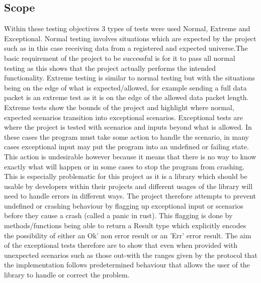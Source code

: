 \documentclass[11pt,a4paper]{report}
\begin{document}
\subsection{Scope}
Within these testing objectives 3 types of tests were used Normal, Extreme and Exceptional. Normal testing involves situations which are expected by the project such as in this case receiving data from a registered and expected universe.The basic requirement of the project to be successful is for it to pass all normal testing as this shows that the project actually performs the intended functionality. Extreme testing is similar to normal testing but with the situations being on the edge of what is expected/allowed, for example sending a full data packet is an extreme test as it is on the edge of the allowed data packet length. Extreme tests show the bounds of the project and highlight where normal, expected scenarios transition into exceptional scenarios. Exceptional tests are where the project is tested with scenarios and inputs beyond what is allowed. In these cases the program must take some action to handle the scenario, in many cases exceptional input may put the program into an undefined or failing state. This action is undesirable however because it means that there is no way to know exactly what will happen or in some cases to stop the program from crashing. This is especially problematic for this project as it is a library which should be usable by developers within their projects and different usages of the library will need to handle errors in different ways. The project therefore attempts to prevent undefined or crashing behaviour by flagging up exceptional input or scenarios before they cause a crash (called a panic in rust). This flagging is done by methods/functions being able to return a Result type which explicitly encodes the possibility of either an Ok' non error result or an 'Err' error result. The aim of the exceptional tests therefore are to show that even when provided with unexpected scenarios such as those out-with the ranges given by the protocol that the implementation follows predetermined behaviour that allows the user of the library to handle or correct the problem.\\
\end{document}
